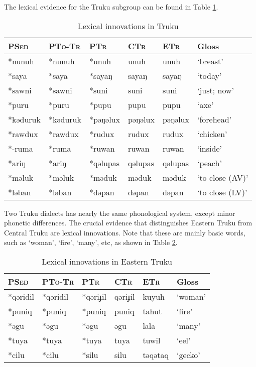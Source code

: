 \documentclass[12pt]{article}
\newcommand{\psed}{\textsc{PSed}\xspace}
\newcommand{\ptotr}{\textsc{PTo-Tr}\xspace}
\newcommand{\ptr}{\textsc{PTr}\xspace}
\newcommand{\sctr}{\textsc{CTr}\xspace}
\newcommand{\sctrf}{Central Truku\xspace}
\newcommand{\setr}{\textsc{ETr}\xspace}
\newcommand{\setrf}{Eastern Truku\xspace}
\begin{document}
The lexical evidence for the Truku subgroup can be found in Table \ref{tab:trlex}. 

\begin{table}[!hbtp]
\centering
\caption{Lexical innovations in Truku}
\label{tab:trlex}
\begin{tabular}{llllll}
\hline
\psed      & \ptotr   & \ptr     & \sctr   & \setr   & Gloss               \\ \hline
*nunuh  & *nunuh  & *unuh    & unuh    & unuh    & `breast'        \\
*saya   & *saya   & *sayaŋ   & sayaŋ   & sayaŋ   & `today'         \\
*sawni  & *sawni  & *suni    & suni    & suni    & `just; now'     \\
*puru   & *puru   & *pupu    & pupu    & pupu    & `axe'           \\
*kəduruk& *kəduruk& *pəŋəlux & pəŋəlux & pəŋəlux & `forehead'      \\
*rawdux & *rawdux & *rudux   & rudux   & rudux   & `chicken'       \\
*-ruma  & *ruma   & *ruwan   & ruwan   & ruwan   & `inside'        \\
*ariŋ   & *ariŋ   & *qəlupas & qəlupas & qəlupas & `peach'         \\
*məluk  & *məluk  & *məduk   & məduk   & məduk   & `to close (AV)' \\
*ləban  & *ləban  & *dəpan   & dəpan   & dəpan   & `to close (LV)' \\ \hline
\end{tabular}
\end{table}

Two Truku dialects has nearly the same phonological system, except minor phonetic differences. The crucial evidence that distinguishes \setrf from \sctrf are lexical innovations. Note that these are mainly basic words, such as `woman', `fire', `many', etc, as shown in Table \ref{tab:etrlex}.

\begin{table}[!hbtp]
\centering
\caption{Lexical innovations in \setrf}
\label{tab:etrlex}
\begin{tabular}{llllll}
\hline
\psed      & \ptotr   & \ptr     & \sctr   & \setr   & Gloss               \\ \hline
*qəridil & *qəridil & *qəriɟil & qəriɟil & kuyuh   & `woman'         \\
*puniq   & *puniq   & *puniq   & puniq   & tahut   & `fire'          \\
*əgu     & *əgu     & *əgu     & əgu     & lala    & `many'          \\
*tuya    & *tuya    & *tuya    & tuya    & tuwil   & `eel'           \\
*cilu    & *cilu    & *silu    & silu    & təqətaq & `gecko'         \\ \hline
\end{tabular}
\end{table}
\end{document}
